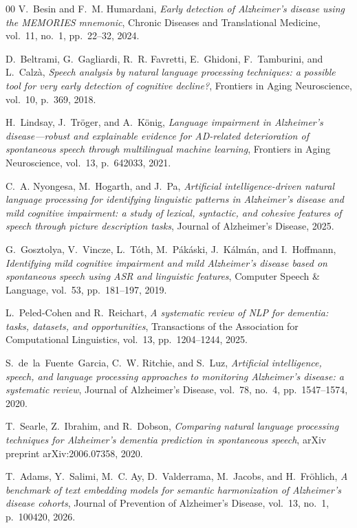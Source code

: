 \documentclass[final,5p,times]{elsarticle}
\begin{document}
\begin{thebibliography}{00}
V.~Besin and F.~M. Humardani,
\textit{Early detection of Alzheimer's disease using the MEMORIES mnemonic},
Chronic Diseases and Translational Medicine,
vol.~11, no.~1,
pp.~22--32,
2024.

D.~Beltrami, G.~Gagliardi, R.~R. Favretti, E.~Ghidoni, F.~Tamburini, and L.~Calz\`a,
\textit{Speech analysis by natural language processing techniques: a possible tool for very early detection of cognitive decline?},
Frontiers in Aging Neuroscience,
vol.~10,
p.~369,
2018.

H.~Lindsay, J.~Tr{\"o}ger, and A.~K{\"o}nig,
\textit{Language impairment in Alzheimer’s disease—robust and explainable evidence for AD-related deterioration of spontaneous speech through multilingual machine learning},
Frontiers in Aging Neuroscience,
vol.~13,
p.~642033,
2021.

C.~A. Nyongesa, M.~Hogarth, and J.~Pa,
\textit{Artificial intelligence-driven natural language processing for identifying linguistic patterns in Alzheimer's disease and mild cognitive impairment: a study of lexical, syntactic, and cohesive features of speech through picture description tasks},
Journal of Alzheimer’s Disease,
2025.

G.~Gosztolya, V.~Vincze, L.~T{\'o}th, M.~P{\'a}k{\'a}ski, J.~K{\'a}lm{\'a}n, and I.~Hoffmann,
\textit{Identifying mild cognitive impairment and mild Alzheimer’s disease based on spontaneous speech using ASR and linguistic features},
Computer Speech \& Language,
vol.~53,
pp.~181--197,
2019.

L.~Peled-Cohen and R.~Reichart,
\textit{A systematic review of NLP for dementia: tasks, datasets, and opportunities},
Transactions of the Association for Computational Linguistics,
vol.~13,
pp.~1204--1244,
2025.

S.~de~la~Fuente~Garcia, C.~W. Ritchie, and S.~Luz,
\textit{Artificial intelligence, speech, and language processing approaches to monitoring Alzheimer’s disease: a systematic review},
Journal of Alzheimer’s Disease,
vol.~78, no.~4,
pp.~1547--1574,
2020.

T.~Searle, Z.~Ibrahim, and R.~Dobson,
\textit{Comparing natural language processing techniques for Alzheimer's dementia prediction in spontaneous speech},
arXiv preprint arXiv:2006.07358,
2020.

T.~Adams, Y.~Salimi, M.~C. Ay, D.~Valderrama, M.~Jacobs, and H.~Fr{\"o}hlich,
\textit{A benchmark of text embedding models for semantic harmonization of Alzheimer's disease cohorts},
Journal of Prevention of Alzheimer’s Disease,
vol.~13, no.~1,
p.~100420,
2026.


\end{thebibliography}
\end{document}
